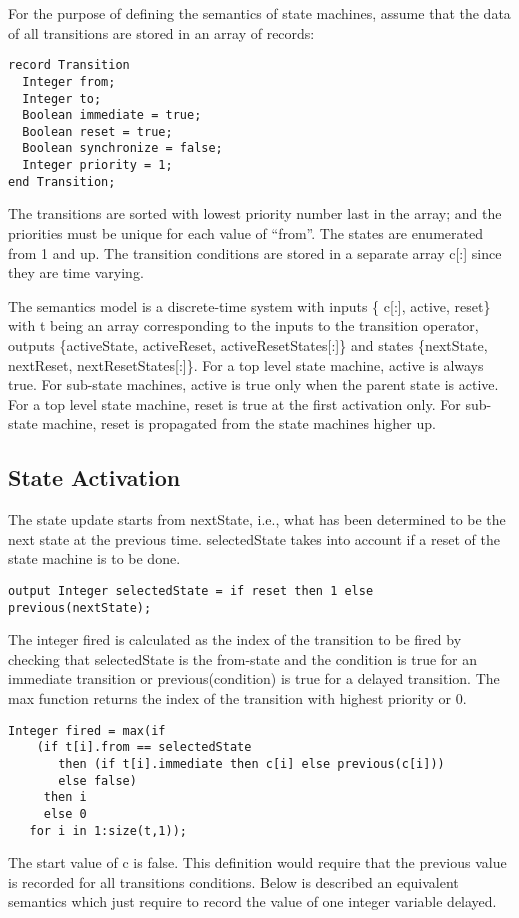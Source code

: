For the purpose of defining the semantics of state machines, assume that
the data of all transitions are stored in an array of records:

\begin{lstlisting}[language=modelica]
record Transition
  Integer from;
  Integer to;
  Boolean immediate = true;
  Boolean reset = true;
  Boolean synchronize = false;
  Integer priority = 1;
end Transition;
\end{lstlisting}

The transitions are sorted with lowest priority number last in the
array; and the priorities must be unique for each value of ``from''. The
states are enumerated from 1 and up. The transition conditions are
stored in a separate array c{[}:{]} since they are time varying.

  The semantics model is a discrete-time system with inputs \{ c{[}:{]},
  active, reset\} with t being an array corresponding to the inputs to the
  transition operator, outputs \{activeState, activeReset,
  activeResetStates{[}:{]}\} and states \{nextState, nextReset,
  nextResetStates{[}:{]}\}. For a top level state machine, active is
  always true. For sub-state machines, active is true only when the parent
  state is active. For a top level state machine, reset is true at the
  first activation only. For sub-state machine, reset is propagated from
the state machines higher up.

\subsection{State Activation}

The state update starts from nextState, i.e., what has been determined
to be the next state at the previous time. selectedState takes into
account if a reset of the state machine is to be done.

\begin{lstlisting}[language=modelica]
  output Integer selectedState = if reset then 1 else previous(nextState);
\end{lstlisting}
The integer fired is calculated as the index of the transition to be
fired by checking that selectedState is the from-state and the condition
is true for an immediate transition or previous(condition) is true for a
delayed transition. The max function returns the index of the transition
with highest priority or 0.

\begin{lstlisting}[language=modelica]
  Integer fired = max(if
    (if t[i].from == selectedState
	   then (if t[i].immediate then c[i] else previous(c[i]))
	   else false)
	 then i
	 else 0
   for i in 1:size(t,1));
\end{lstlisting}
The start value of c is false. This definition would require that the
previous value is recorded for all transitions conditions. Below is
described an equivalent semantics which just require to record the value
of one integer variable delayed.

